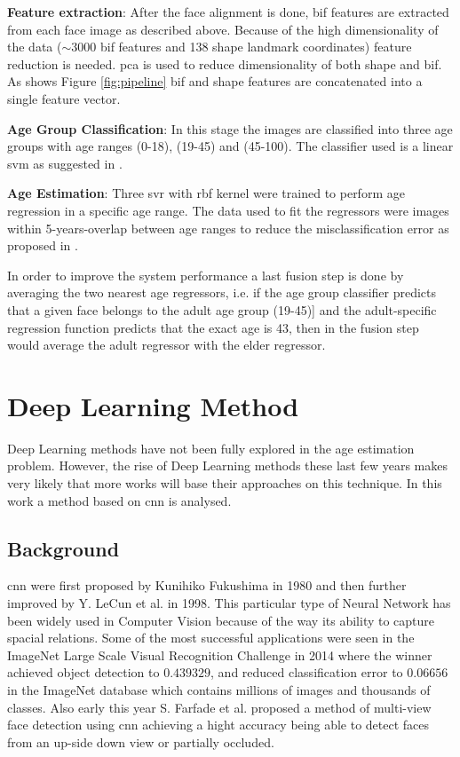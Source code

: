 \textbf{Feature extraction}: 
After the face alignment is done, \gls{bif} features are extracted from each face image as described above. Because of the high dimensionality of the data ($\sim3000$ \gls{bif} features and 138 shape landmark coordinates) feature reduction is needed. \gls{pca} is used to reduce dimensionality of both shape and \gls{bif}. As shows Figure \ref{fig:pipeline} \gls{bif} and shape features are concatenated into a single feature vector.

\textbf{Age Group Classification}:
In this stage the images are classified into three age groups with age ranges (0-18), (19-45) and (45-100). The classifier used is a linear \gls{svm} as suggested in \cite{4531189}.

\textbf{Age Estimation}:
Three \gls{svr} with \gls{rbf} kernel were trained to perform age regression in a specific age range. The data used to fit the regressors were images within 5-years-overlap between age ranges to reduce the misclassification error as proposed in \cite{han:age}. 

In order to improve the system performance a last fusion step is done by averaging the two nearest age regressors, i.e. if the age group classifier predicts that a given face belongs to the adult age group (19-45)] and the adult-specific regression function predicts that the exact age is 43, then in the fusion step would average the adult regressor with the elder regressor.


\section{Deep Learning Method}

Deep Learning methods have not been fully explored in the age estimation problem. However, the rise of Deep Learning methods these last few years makes very likely that more works will base their approaches on this technique. In this work a method based on \gls{cnn} is analysed.

\subsection{Background}
\gls{cnn} were first proposed by Kunihiko Fukushima \cite{fukushima:neocognitronbc} in 1980 and then further improved by Y. LeCun et al. \cite{Lecun98gradient-basedlearning} in 1998. This particular type of Neural Network has been widely used in Computer Vision because of the way its ability to capture spacial relations. Some of the most successful applications were seen in the ImageNet Large Scale Visual Recognition Challenge \cite{DBLP:journals/corr/RussakovskyDSKSMHKKBBF14} in 2014 where the winner \cite{DBLP:journals/corr/SzegedyLJSRAEVR14} achieved object detection to $0.439329$, and reduced classification error to $0.06656$ in the ImageNet database which contains millions of images and thousands of classes. Also early this year S. Farfade et al. \cite{DBLP:journals/corr/FarfadeSL15} proposed a method of multi-view face detection using \gls{cnn} achieving a hight accuracy being able to detect faces from an up-side down view or partially occluded.

